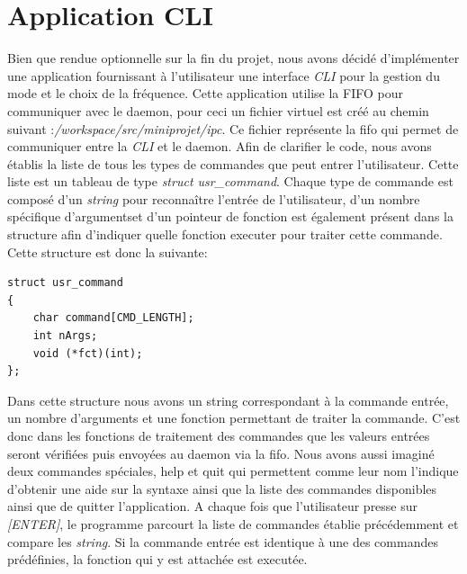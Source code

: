 \documentclass{ReportTemplate}
\begin{document}
\chapter{Application CLI}
Bien que rendue optionnelle sur la fin du projet, nous avons décidé
d'implémenter une application fournissant à l'utilisateur une interface \textit{CLI} pour
la gestion du mode et le choix de la fréquence.\newline
Cette application utilise la FIFO pour communiquer avec le daemon, pour ceci un
fichier virtuel est créé au chemin suivant
:\textit{/workspace/src/miniprojet/ipc}. Ce fichier représente la fifo qui
permet de communiquer entre la \textit{CLI} et le daemon.\newline
Afin de clarifier le code, nous avons établis la liste de tous les types de
commandes que peut entrer l'utilisateur. Cette liste est un tableau de type
\textit{struct usr\_command}. Chaque type de commande est composé d'un
\textit{string} pour reconnaître l'entrée de l'utilisateur, d'un nombre
spécifique d'argumentset d'un pointeur de fonction est également présent dans la
structure afin d'indiquer quelle fonction executer pour traiter cette commande.
Cette structure est donc la suivante:
\begin{verbatim}
struct usr_command
{
    char command[CMD_LENGTH];
    int nArgs;
    void (*fct)(int);
};
\end{verbatim}
Dans cette structure nous avons un string correspondant à la commande entrée, un
nombre d'arguments et une fonction permettant de traiter la commande.\newline
C'est donc dans les fonctions de traitement des commandes que les valeurs
entrées seront vérifiées puis envoyées au daemon via la fifo. Nous avons aussi
imaginé deux commandes spéciales, help et quit qui permettent comme leur nom
l'indique d'obtenir une aide sur la syntaxe ainsi que la liste des commandes
disponibles ainsi que de quitter l'application.
A chaque fois que l'utilisateur presse sur \textit{[ENTER]}, le programme parcourt la
liste de commandes établie précédemment et compare les \textit{string}.
Si la commande entrée est identique à une des commandes prédéfinies, la fonction qui y est attachée est executée.
\end{document}
